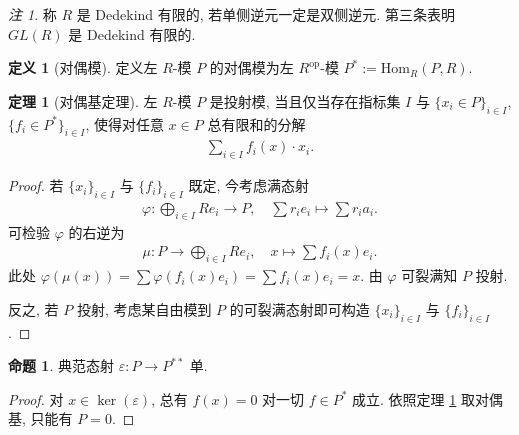 \documentclass{MainStyle}
\theoremstyle{definition}
\theoremstyle{definition}
\theoremstyle{definition}
\newtheorem{definition}{定义}
\theoremstyle{definition}
\newtheorem{proposition}{命题}
\theoremstyle{definition}
\theoremstyle{definition}
\theoremstyle{definition}
\newtheorem{theorem}{定理}
\theoremstyle{remark}
\newtheorem{remark}{注}
\theoremstyle{remark}
\begin{document}
\begin{remark}
    称 $R$ 是 Dedekind 有限的, 若单侧逆元一定是双侧逆元. 第三条表明 $GL(R)$ 是 Dedekind 有限的.
\end{remark}

\begin{definition}[对偶模]
    定义左 $R$-模 $P$ 的对偶模为左 $R^{\mathrm{op}}$-模 $P^\ast:=\mathrm{Hom}_R(P,R)$.
\end{definition}

\begin{theorem}[对偶基定理]\label{dual-basis}
    左 $R$-模 $P$ 是投射模, 当且仅当存在指标集 $I$ 与 $\{x_i\in P\}_{i\in I}$, $\{f_i\in P^\ast\}_{i\in I}$, 使得对任意 $x\in P$ 总有限和的分解
    \begin{align*}
        \sum_{i\in I}f_i(x)\cdot x_i.
    \end{align*}
    \begin{proof}
        若 $\{x_i\}_{i\in I}$ 与 $\{f_i\}_{i\in I}$ 既定, 今考虑满态射
        \begin{align*}
            \varphi: \bigoplus_{i\in I}Re_i\to P, \quad \sum r_i e_i\mapsto \sum r_i a_i.
        \end{align*}
        可检验 $\varphi$ 的右逆为
        \begin{align*}
            \mu:P\to \bigoplus_{i\in I}Re_i,\quad x\mapsto \sum f_i(x)e_i.
        \end{align*}
        此处 $\varphi(\mu(x))=\sum \varphi(f_i(x)e_i)=\sum f_i(x)e_i=x$. 由 $\varphi$ 可裂满知 $P$ 投射. \par
        反之, 若 $P$ 投射, 考虑某自由模到 $P$ 的可裂满态射即可构造 $\{x_i\}_{i\in I}$ 与 $\{f_i\}_{i\in I}$.
    \end{proof}
\end{theorem}

\begin{proposition}
    典范态射 $\varepsilon: P\to P^{\ast\ast}$ 单.
    \begin{proof}
        对 $x\in \ker(\varepsilon)$, 总有 $f(x)= 0$ 对一切 $f\in P^\ast$ 成立. 依照定理 \ref{dual-basis} 取对偶基, 只能有 $P=0$.
    \end{proof}
\end{proposition}
\end{document}
